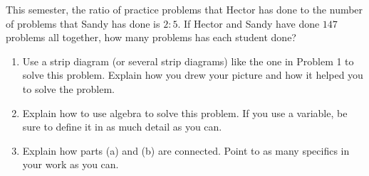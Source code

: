 \documentclass[nooutcomes,noauthor,handout]{ximera}
\begin{document}
\begin{problem}
This semester, the ratio of practice problems that Hector has done to the number of problems that Sandy has done is $2:5$. If Hector and Sandy have done $147$ problems all together, how many problems has each student done?


\begin{enumerate}
	\item Use a strip diagram (or several strip diagrams) like the one in Problem 1 to solve this problem. Explain how you drew your picture and how it helped you to solve the problem.
	\item Explain how to use algebra to solve this problem. If you use a variable, be sure to define it in as much detail as you can.
	\item Explain how parts (a) and (b) are connected. Point to as many specifics in your work as you can.
\end{enumerate}
\end{problem}




\newpage
\end{document}
